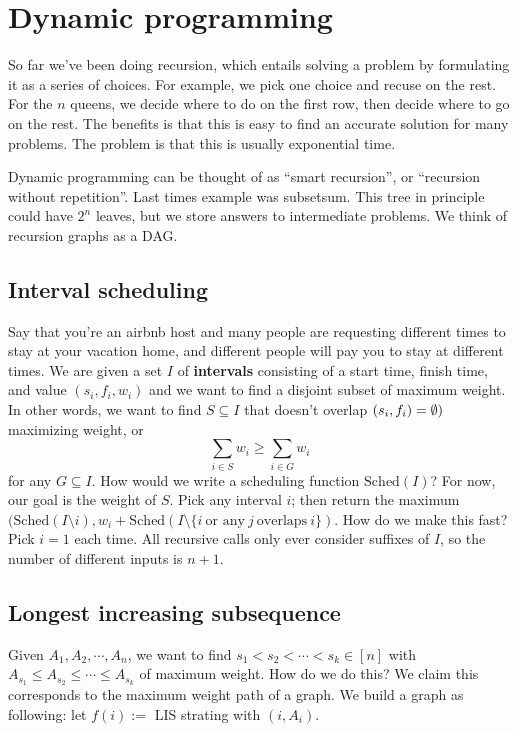 \section{Dynamic programming} 
So far we've been doing recursion, which entails solving a problem by formulating it as a series of choices. For example, we pick one choice and recuse on the rest. For the $n$ queens, we decide where to do on the first row, then decide where to go on the rest. The benefits is that this is easy to find an accurate solution for many problems. The problem is that this is usually exponential time.

Dynamic programming can be thought of as ``smart recursion'', or ``recursion without repetition''. Last times example was subsetsum. This tree in principle could have $2^n $ leaves, but we store answers to intermediate problems. We think of recursion graphs as a DAG.

\subsection{Interval scheduling}
Say that you're an airbnb host and many people are requesting different times to stay at your vacation home, and different people will pay you to stay at different times. We are given a set $I$ of \textbf{intervals} consisting of a start time, finish time, and value $(s_i ,f_i ,w_i )$ and we want to find a disjoint subset of maximum weight. In other words, we want to find $S \subseteq I$ that doesn't overlap $(s_i ,f_i )=\emptyset)$ maximizing weight, or \[
\sum_{i \in S}w_i \geq \sum _{i \in G}w_i 
\] for any $G \subseteq I$. How would we write a scheduling function $\mathrm{Sched}(I)$? For now, our goal is the weight of $S$. Pick any interval $i$; then return the maximum $(\mathrm{Sched}(I \setminus i), w_i +\mathrm{Sched}(I \setminus \{i \ \text{or any} \ j \ \text{overlaps} \ i\} )$. How do we make this fast? Pick $i=1$ each time. All recursive calls only ever consider suffixes of $I$, so the number of different inputs is $n+1$.

\subsection{Longest increasing subsequence}
Given $A_1, A_2, \cdots ,A_n $, we want to find $s_1 <s_2< \cdots <s_k \in [n]$ with $A_{s_1}\leq A_{s_2}\leq \cdots \leq A_{s_k}$ of maximum weight. How do we do this? We claim this corresponds to the maximum weight path of a graph. We build a graph as following: let $f(i):=$ LIS strating with $(i,A_i )$.

